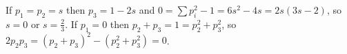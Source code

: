 If $p_1 = p_2 = s$ then $p_3 = 1-2s$ and $0 = \sum p_i^2 - 1 = 6s^2 - 4s = 2s(3s-2)$, so $s = 0$ or $s = \tfrac23$. If $p_1 = 0$ then $p_2 + p_3 = 1 = p_2^2 + p_3^2$, so $2p_2p_3 = (p_2+p_3)^2 - (p_2^2+p_3^2) = 0$.

